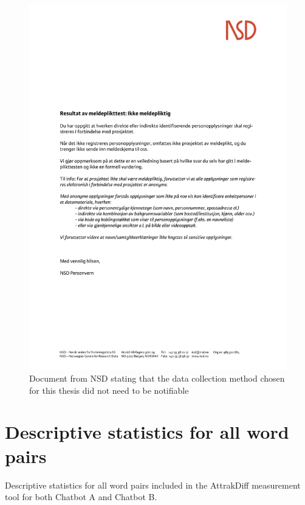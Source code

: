  \begin{figure}[H]
        \centering
        \includegraphics[scale=0.7]{figures/ikke_meldepliktig.png}
        \caption{Document from NSD stating that the data collection method chosen for this thesis did not need to be notifiable}
        \label{fig:ikkemeld}
    \end{figure}

\section{Descriptive statistics for all word pairs}
Descriptive statistics for all word pairs included in the AttrakDiff measurement tool for both Chatbot A and Chatbot B.

